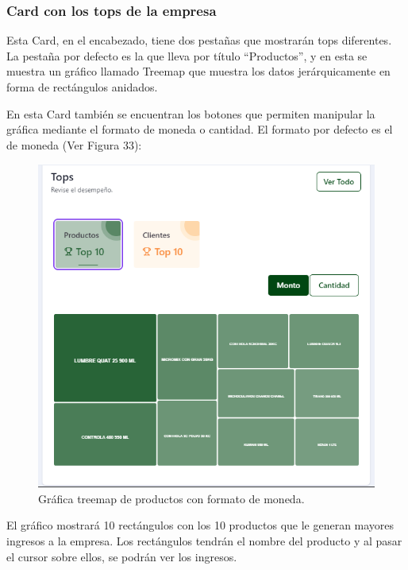 \subsubsection{Card con los tops de la empresa}
Esta Card, en el encabezado, tiene dos pestañas que mostrarán tops diferentes. La pestaña por defecto es la que lleva por título ``Productos'', y en esta se muestra un gráfico llamado Treemap que muestra los datos jerárquicamente en forma de rectángulos anidados.

En esta Card también se encuentran los botones que permiten manipular la gráfica mediante el formato de moneda o cantidad. El formato por defecto es el de moneda (Ver Figura 33): 

    \begin{figure}[H]
        \begin{center}
            \includegraphics[scale=0.40]{img/actividades/dahsboard-admin/top-producto-monto.png}
            \caption{Gráfica treemap de productos con formato de moneda.}
            \label{fig:top-producto-monto}
        \end{center}
    \end{figure}

El gráfico mostrará 10 rectángulos con los 10 productos que le generan mayores ingresos a la empresa. Los rectángulos tendrán el nombre del producto y al pasar el cursor sobre ellos, se podrán ver los ingresos.

